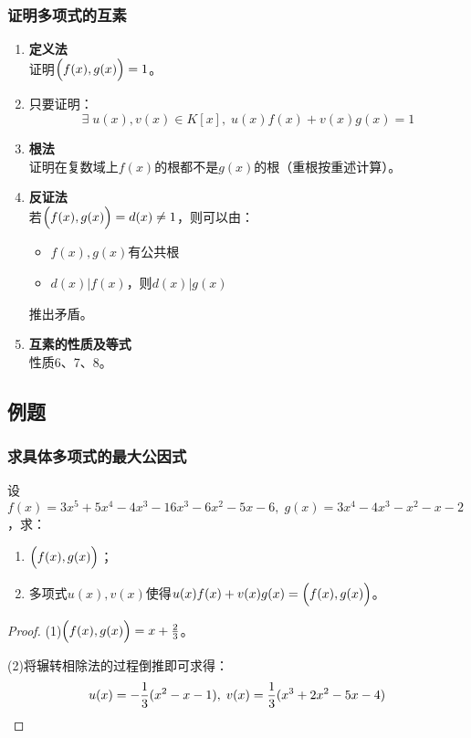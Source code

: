 \subsubsection{证明多项式的互素}
\begin{enumerate}
	\item \textbf{定义法} \\
	证明$\Bigl(f(x),g(x)\Bigr)=1$。
	\item 只要证明：
	\begin{equation*}
		\exists\;u(x),v(x)\in K[x],\;u(x)f(x)+v(x)g(x)=1
	\end{equation*}
	\item \textbf{根法} \\
	证明在复数域上$f(x)$的根都不是$g(x)$的根（重根按重述计算）。
	\item \textbf{反证法} \\ 
	若$\Bigl(f(x),g(x)\Bigr)=d(x)\ne1$，则可以由：
	\begin{itemize}
		\item $f(x),g(x)$有公共根
		\item $d(x)|f(x)$，则$d(x)|g(x)$ 
	\end{itemize}
	推出矛盾。
	\item \textbf{互素的性质及等式} \\
	性质6、7、8。
\end{enumerate}

\subsection{例题}
\subsubsection{求具体多项式的最大公因式}
\begin{theorem}
	设$f(x)=3x^5+5x^4-4x^3-16x^3-6x^2-5x-6,\;g(x)=3x^4-4x^3-x^2-x-2$，求：
	\begin{enumerate}
		\item $\Bigl(f(x),g(x)\Bigr)$；
		\item 多项式$u(x),v(x)$使得$u(x)f(x)+v(x)g(x)=\Bigl(f(x),g(x)\Bigr)$。
	\end{enumerate}
\end{theorem}
\begin{proof}
	(1)$\Bigl(f(x),g(x)\Bigr)=x+\frac{2}{3}$。\par
	(2)将辗转相除法的过程倒推即可求得：
	\begin{equation*}
		u(x)=-\frac{1}{3}(x^2-x-1),\;v(x)=\frac{1}{3}(x^3+2x^2-5x-4)\qedhere
	\end{equation*}
\end{proof}
